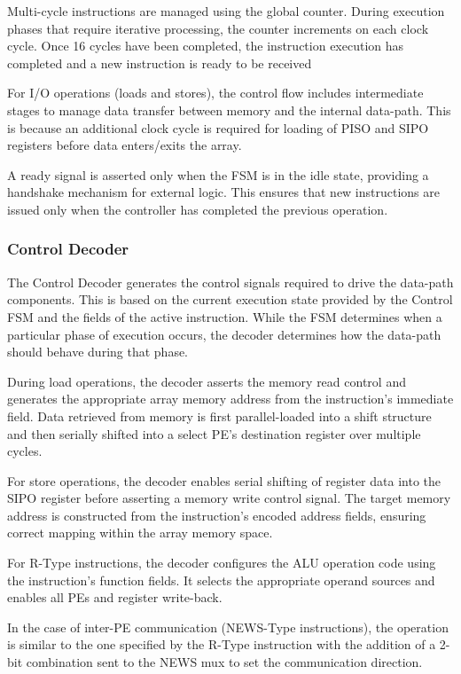         Multi-cycle instructions are managed using the global counter. During execution phases that require iterative processing, the counter increments on each clock cycle. Once 16 cycles have been completed, the instruction execution has completed and a new instruction is ready to be received
        
        For I/O operations (loads and stores), the control flow includes intermediate stages to manage data transfer between memory and the internal data-path. This is because an additional clock cycle is required for loading of PISO and SIPO registers before data enters/exits the array.
        
        A ready signal is asserted only when the FSM is in the idle state, providing a handshake mechanism for external logic. This ensures that new instructions are issued only when the controller has completed the previous operation.
        
        \subsubsection{Control Decoder}    
        The Control Decoder generates the control signals required to drive the data-path components. This is based on the current execution state provided by the Control FSM and the fields of the active instruction. While the FSM determines when a particular phase of execution occurs, the decoder determines how the data-path should behave during that phase. 

        During load operations, the decoder asserts the memory read control and generates the appropriate array memory address from the instruction’s immediate field. Data retrieved from memory is first parallel-loaded into a shift structure and then serially shifted into a select PE's destination register over multiple cycles. 
        
        For store operations, the decoder enables serial shifting of register data into the SIPO register before asserting a memory write control signal. The target memory address is constructed from the instruction’s encoded address fields, ensuring correct mapping within the array memory space. 
        
        For R-Type instructions, the decoder configures the ALU operation code using the instruction’s function fields. It selects the appropriate operand sources and enables all PEs and register write-back.
        
        In the case of inter-PE communication (NEWS-Type instructions), the operation is similar to the one specified by the R-Type instruction with the addition of a 2-bit combination sent to the NEWS mux to set the communication direction.
    
